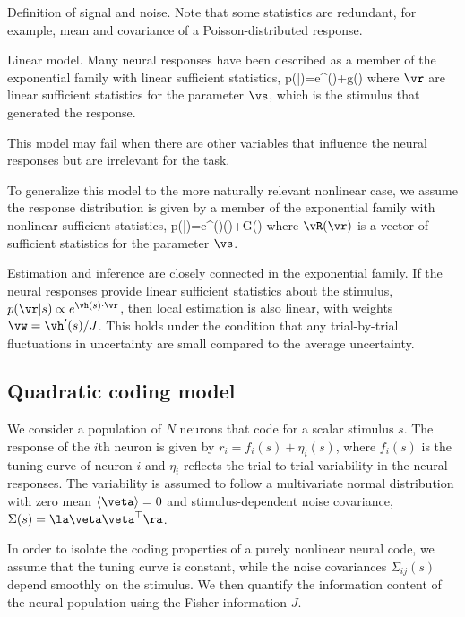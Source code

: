 \documentclass[11pt,twocolumn]{article}
\begin{document}
Definition of signal and noise. Note that some statistics are redundant, for example, mean and covariance of a Poisson-distributed response.

Linear model. Many neural responses have been described as a member of the exponential family with linear sufficient statistics,
\be
p(\vr|\vs)=e^{\vh(\vs)\cdot\vr+g(\vs)}
\ee
where $\vr$ are linear sufficient statistics for the parameter $\vs$, which is the stimulus that generated the response.

This model may fail when there are other variables that influence the neural responses but are irrelevant for the task.

To generalize this model to the more naturally relevant nonlinear case, we assume the response distribution is given by a member of the exponential family with nonlinear sufficient statistics,
\be
p(\vr|\vs)=e^{\vH(\vs)\cdot\vR(\vr)+G(\vs)}
\ee
where $\vR(\vr)$ is a vector of sufficient statistics for the parameter $\vs$.

Estimation and inference are closely connected in the exponential family. If the neural responses provide linear sufficient statistics about the stimulus, $p(\vr|s)\propto e^{\vh(s)\cdot\vr}$, then local estimation is also linear, with weights $\vw=\vh'(s)/J$. This holds under the condition that any trial-by-trial fluctuations in uncertainty are small compared to the average uncertainty.




\subsection{Quadratic coding model}

We consider a population of $N$ neurons that code for a scalar stimulus $s$. The response of the $i$th neuron is given by $r_i=f_i(s)+\eta_i(s)$, where $f_i(s)$ is the tuning curve of neuron $i$ and $\eta_i$ reflects the trial-to-trial variability in the neural responses. The variability is assumed to follow a multivariate normal distribution with zero mean $\langle\veta\rangle=0$ and stimulus-dependent noise covariance, $\Sigma(s)=\la\veta\veta^\top\ra$.

In order to isolate the coding properties of a purely nonlinear neural code, we assume that the tuning curve is constant, while the noise covariances $\Sigma_{ij}(s)$ depend smoothly on the stimulus. We then quantify the information content of the neural population using the Fisher information $J$.
\end{document}
